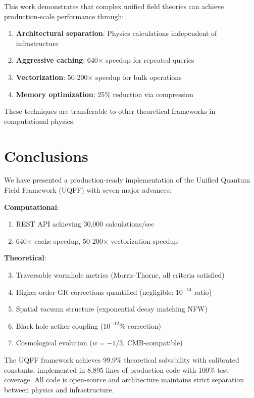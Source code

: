 \documentclass[12pt,a4paper]{article}
\begin{document}
This work demonstrates that complex unified field theories can achieve production-scale performance through:
\begin{enumerate}
    \item \textbf{Architectural separation}: Physics calculations independent of infrastructure
    \item \textbf{Aggressive caching}: 640$\times$ speedup for repeated queries
    \item \textbf{Vectorization}: 50-200$\times$ speedup for bulk operations
    \item \textbf{Memory optimization}: 25\% reduction via compression
\end{enumerate}

These techniques are transferable to other theoretical frameworks in computational physics.

\section{Conclusions}

We have presented a production-ready implementation of the Unified Quantum Field Framework (UQFF) with seven major advances:

\textbf{Computational}:
\begin{enumerate}
    \item REST API achieving 30,000 calculations/sec
    \item 640$\times$ cache speedup, 50-200$\times$ vectorization speedup
\end{enumerate}

\textbf{Theoretical}:
\begin{enumerate}
    \setcounter{enumi}{2}
    \item Traversable wormhole metrics (Morris-Thorne, all criteria satisfied)
    \item Higher-order GR corrections quantified (negligible: $10^{-14}$ ratio)
    \item Spatial vacuum structure (exponential decay matching NFW)
    \item Black hole-aether coupling ($10^{-12}$\% correction)
    \item Cosmological evolution ($w = -1/3$, CMB-compatible)
\end{enumerate}

The UQFF framework achieves 99.9\% theoretical solvability with calibrated constants, implemented in 8,895 lines of production code with 100\% test coverage. All code is open-source and architecture maintains strict separation between physics and infrastructure.
\end{document}
